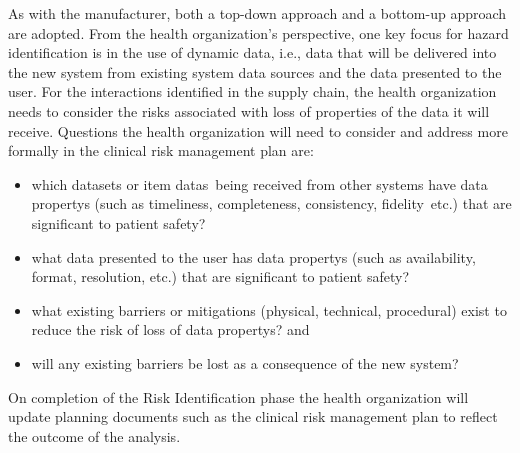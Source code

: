 As with the manufacturer, both a top-down approach and a bottom-up approach are adopted. From the health organization's perspective, one key focus for \gls{hazard} identification is in the use of dynamic data, i.e., data that will be delivered into the new system from existing system data sources and the data presented to the user. For the interactions identified in the supply chain, the health organization needs to consider the risks associated with loss of properties of the data it will receive. Questions the health organization will need to consider and address more formally in the clinical risk management plan are:
\clearpage%
\begin{itemize}
  \item which \glspl{dataset} or \cbstart\glspl{item data}\cbend\ being received from other systems have \glspl{data property} (such as \gls{timeliness}, \gls{completeness}, \gls{consistency}, \cbstart\gls{fidelity}\cbend\ etc.) that are significant to patient safety? 
  \item what data presented to the user has \glspl{data property} (such as \gls{availability}, format, \gls{resolution}, etc.) that are significant to patient safety?
  \item what existing barriers or \glspl{mitigation} (physical, technical, procedural) exist to reduce the risk of loss of \glspl{data property}? and
  \item will any existing barriers be lost as a consequence of the new system?
\end{itemize}

On completion of the Risk Identification phase the health organization will update planning documents such as the clinical risk management plan to reflect the outcome of the analysis.

